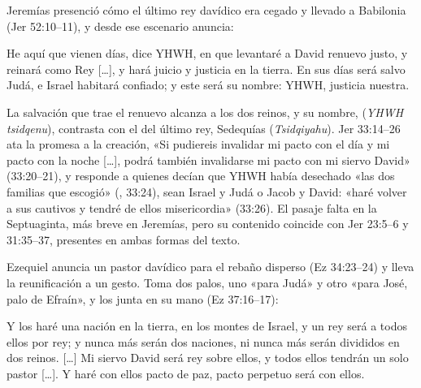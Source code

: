 Jeremías presenció cómo el último rey davídico era cegado y llevado a Babilonia (Jer 52:10--11), y desde ese escenario anuncia:

\begin{cita}He aquí que vienen días, dice YHWH, en que levantaré a David renuevo justo, y reinará como Rey [\ldots], y hará juicio y justicia en la tierra. En sus días será salvo Judá, e Israel habitará confiado; y este será su nombre: YHWH, justicia nuestra.\end{cita}

La salvación que trae el renuevo alcanza a los dos reinos, y su nombre,  (\emph{YHWH tsidqenu}), contrasta con el del último rey, Sedequías (\emph{Tsidqiyahu}). Jer 33:14--26 ata la promesa a la creación, «Si pudiereis invalidar mi pacto con el día y mi pacto con la noche [\ldots], podrá también invalidarse mi pacto con mi siervo David» (33:20--21), y responde a quienes decían que YHWH había desechado «las dos familias que escogió» (, 33:24), sean Israel y Judá o Jacob y David: «haré volver a sus cautivos y tendré de ellos misericordia» (33:26). El pasaje falta en la Septuaginta, más breve en Jeremías, pero su contenido coincide con Jer 23:5--6 y 31:35--37, presentes en ambas formas del texto.

Ezequiel anuncia un pastor davídico para el rebaño disperso (Ez 34:23--24) y lleva la reunificación a un gesto. Toma dos palos, uno «para Judá» y otro «para José, palo de Efraín», y los junta en su mano (Ez 37:16--17):

\begin{cita}Y los haré una nación en la tierra, en los montes de Israel, y un rey será a todos ellos por rey; y nunca más serán dos naciones, ni nunca más serán divididos en dos reinos. [\ldots] Mi siervo David será rey sobre ellos, y todos ellos tendrán un solo pastor [\ldots]. Y haré con ellos pacto de paz, pacto perpetuo será con ellos.\end{cita}

